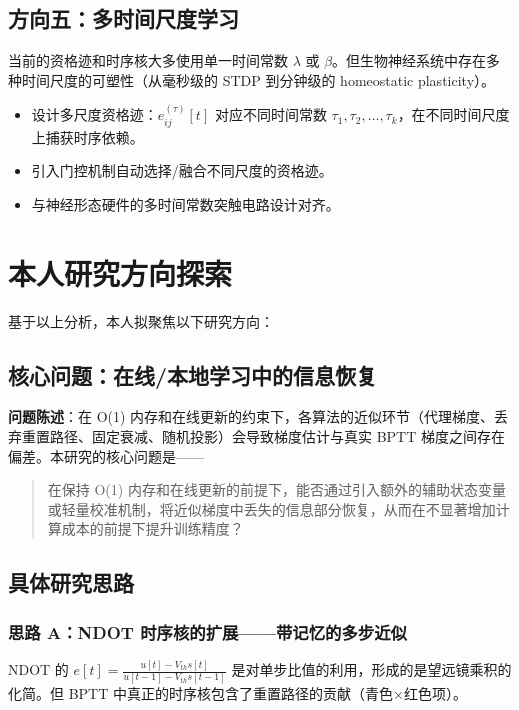 \documentclass[journal,12pt,onecolumn]{IEEEtran}
\begin{document}
\subsection{方向五：多时间尺度学习}

当前的资格迹和时序核大多使用单一时间常数 $\lambda$ 或 $\beta$。但生物神经系统中存在多种时间尺度的可塑性（从毫秒级的 STDP 到分钟级的 homeostatic plasticity）。

\begin{itemize}
    \item 设计多尺度资格迹：$e_{ij}^{(\tau)}[t]$ 对应不同时间常数 $\tau_1, \tau_2, \dots, \tau_k$，在不同时间尺度上捕获时序依赖。
    \item 引入门控机制自动选择/融合不同尺度的资格迹。
    \item 与神经形态硬件的多时间常数突触电路设计对齐。
\end{itemize}

\section{本人研究方向探索}

基于以上分析，本人拟聚焦以下研究方向：

\subsection{核心问题：在线/本地学习中的信息恢复}

\textbf{问题陈述}：在 O(1) 内存和在线更新的约束下，各算法的近似环节（代理梯度、丢弃重置路径、固定衰减、随机投影）会导致梯度估计与真实 BPTT 梯度之间存在偏差。本研究的核心问题是——

\begin{quote}
在保持 O(1) 内存和在线更新的前提下，能否通过引入额外的辅助状态变量或轻量校准机制，将近似梯度中丢失的信息部分恢复，从而在不显著增加计算成本的前提下提升训练精度？
\end{quote}

\subsection{具体研究思路}

\subsubsection{思路 A：NDOT 时序核的扩展——带记忆的多步近似}

NDOT 的 $e[t] = \frac{u[t] - V_{th}s[t]}{u[t-1] - V_{th}s[t-1]}$ 是对单步比值的利用，形成的是望远镜乘积的化简。但 BPTT 中真正的时序核包含了重置路径的贡献（青色×红色项）。
\end{document}
